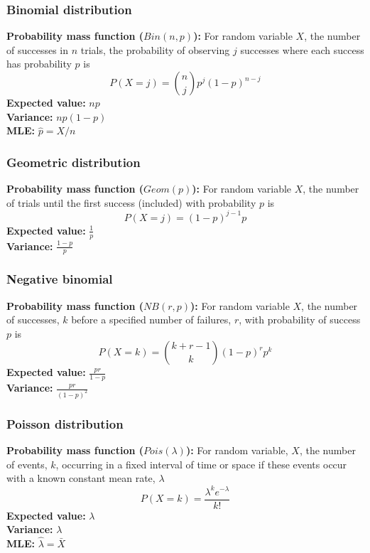 \documentclass{article}
\begin{document}
\subsubsection{Binomial distribution}
\textbf{Probability mass function ($Bin(n,p)$):} For random variable $X$, the number of successes in $n$ trials, the probability of observing $j$ successes where each success has probability $p$ is
\begin{equation*}
    P(X = j) = {n \choose j} p^j (1 - p)^{n-j}
\end{equation*}
\textbf{Expected value:} $np$\\
\textbf{Variance:} $np(1-p)$\\
\textbf{MLE:} $\hat{p} = X/n$

\subsubsection{Geometric distribution}
\textbf{Probability mass function ($Geom(p)$):} For random variable $X$, the number of trials until the first success (included) with probability $p$ is
\begin{equation*}
    P(X=j) = (1-p)^{j-1}p
\end{equation*}
\textbf{Expected value:} $\frac{1}{p}$\\
\textbf{Variance:} $\frac{1-p}{p}$

\subsubsection{Negative binomial}
\textbf{Probability mass function ($NB(r, p)$):} For random variable $X$, the number of successes, $k$ before a specified number of failures, $r$, with probability of success $p$ is
\begin{equation*}
	P(X = k) = {k + r - 1 \choose k} (1-p)^rp^k
\end{equation*}
\textbf{Expected value:} $\frac{pr}{1-p}$\\
\textbf{Variance:} $\frac{pr}{(1 - p)^2}$

\subsubsection{Poisson distribution}
\textbf{Probability mass function ($Pois(\lambda)$):} For random variable, $X$, the number of events, $k$, occurring in a fixed interval of time or space if these events occur with a known constant mean rate, $\lambda$
\begin{equation*}
	P(X = k) = \frac{\lambda^ke^{-\lambda}}{k!}
\end{equation*}
\textbf{Expected value:} $\lambda$\\
\textbf{Variance:} $\lambda$\\
\textbf{MLE:} $\hat{\lambda} = \bar{X}$
\end{document}
